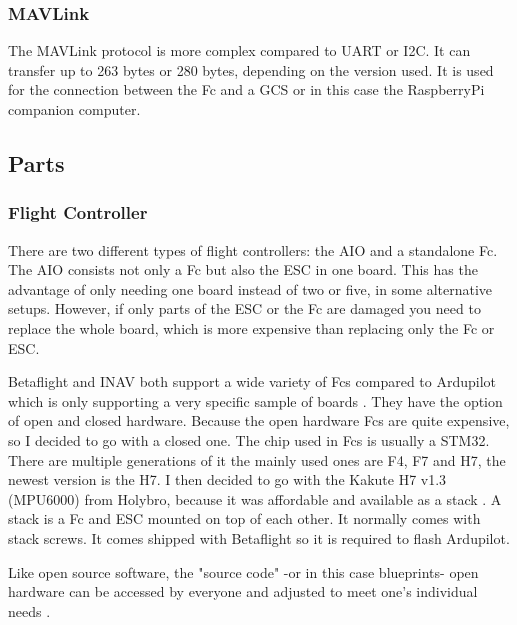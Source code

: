 \documentclass[svgnames]{article}
\begin{document}
	\subsubsection{MAVLink}
	The MAVLink protocol is more complex compared to \gls{UART} or \gls{I2C}. It can transfer up to 263 bytes or 280 bytes, depending on the version used. It is used for the connection between the \gls{Fc} and a \gls{GCS} or in this case the RaspberryPi companion computer.
	\subsection{Parts}
	
	\subsubsection[Fc]{Flight Controller}
	There are two different types of flight controllers: the \gls{AIO} and a standalone \gls{Fc}. The \gls{AIO} consists not only a \gls{Fc} but also the \gls{ESC} in one board. This has the advantage of only needing one board instead of two or five, in some alternative setups. However, if only parts of the \gls{ESC} or the \gls{Fc} are damaged you need to replace the whole board, which is more expensive than replacing only the \gls{Fc} or \gls{ESC}. 
	
	Betaflight and INAV both support a wide variety of \glspl{Fc} compared to Ardupilot which is only supporting a very specific sample of boards \cite{FcSupport}. They have the option of open and closed hardware. Because the open hardware \glspl{Fc} are quite expensive, so I decided to go with a closed one. The chip used in \glspl{Fc} is usually a STM32. There are multiple generations of it the mainly used ones are F4, F7 and H7, the newest version is the H7. I then decided to go with the Kakute H7 v1.3 (MPU6000) from Holybro, because it was affordable and available as a stack \cite{KakuteH7}. A stack is a \gls{Fc} and \gls{ESC} mounted on top of each other. It normally comes with stack screws. It comes shipped with Betaflight so it is required to flash Ardupilot. 
	\begin{Explanation}
		\item Like open source software, the "source code" -or in this case blueprints- open hardware can be accessed by everyone and adjusted to meet one's individual needs \cite{openhardware}.
	\end{Explanation}
\end{document}
